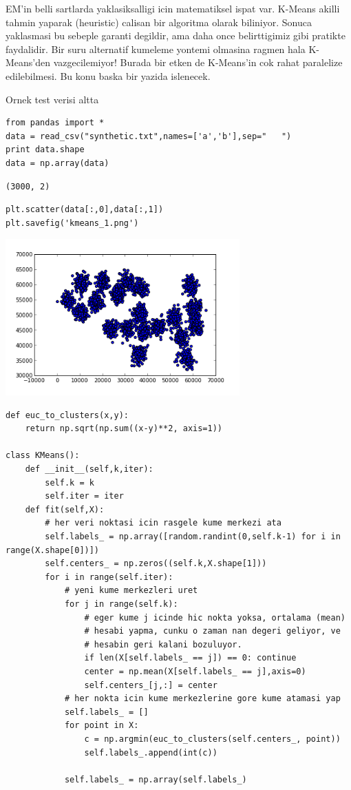 \documentclass[12pt,fleqn]{article}\usepackage{../common}
\begin{document}
EM'in belli sartlarda yaklasiksalligi icin matematiksel ispat
var. K-Means akilli tahmin yaparak (heuristic) calisan bir algoritma
olarak biliniyor. Sonuca yaklasmasi bu sebeple garanti degildir, ama
daha once belirttigimiz gibi pratikte faydalidir. Bir suru alternatif
kumeleme yontemi olmasina ragmen hala K-Means'den vazgecilemiyor!
Burada bir etken de K-Means'in cok rahat paralelize edilebilmesi. Bu
konu baska bir yazida islenecek.

Ornek test verisi altta

\begin{verbatim}
from pandas import *
data = read_csv("synthetic.txt",names=['a','b'],sep="   ")
print data.shape
data = np.array(data)
\end{verbatim}

\begin{verbatim}
(3000, 2)
\end{verbatim}

\begin{verbatim}
plt.scatter(data[:,0],data[:,1])
plt.savefig('kmeans_1.png')
\end{verbatim}

\includegraphics[height=6cm]{kmeans_1.png}
\begin{verbatim}
def euc_to_clusters(x,y):
    return np.sqrt(np.sum((x-y)**2, axis=1))

class KMeans():
    def __init__(self,k,iter):
        self.k = k
        self.iter = iter
    def fit(self,X):
        # her veri noktasi icin rasgele kume merkezi ata
        self.labels_ = np.array([random.randint(0,self.k-1) for i in range(X.shape[0])])
        self.centers_ = np.zeros((self.k,X.shape[1]))
        for i in range(self.iter):
            # yeni kume merkezleri uret
            for j in range(self.k):
                # eger kume j icinde hic nokta yoksa, ortalama (mean)
                # hesabi yapma, cunku o zaman nan degeri geliyor, ve
                # hesabin geri kalani bozuluyor.
                if len(X[self.labels_ == j]) == 0: continue
                center = np.mean(X[self.labels_ == j],axis=0)
                self.centers_[j,:] = center
            # her nokta icin kume merkezlerine gore kume atamasi yap
            self.labels_ = []
            for point in X:
                c = np.argmin(euc_to_clusters(self.centers_, point))
                self.labels_.append(int(c))

            self.labels_ = np.array(self.labels_)
\end{verbatim}
\end{document}
